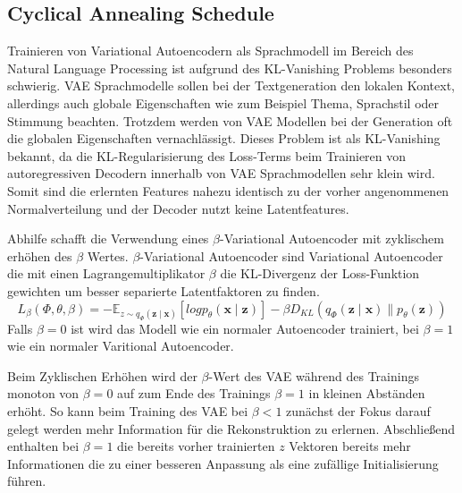 \subsection{Cyclical Annealing Schedule}
\label{cyc_anneal}
Trainieren von Variational Autoencodern als Sprachmodell im Bereich des Natural Language Processing ist aufgrund des KL-Vanishing Problems besonders schwierig.
VAE Sprachmodelle sollen bei der Textgeneration den lokalen Kontext, allerdings auch globale Eigenschaften wie zum Beispiel Thema, Sprachstil oder Stimmung beachten. 
Trotzdem werden von VAE Modellen bei der Generation oft die globalen Eigenschaften vernachlässigt. 
Dieses Problem ist als KL-Vanishing bekannt, da die KL-Regularisierung des Loss-Terms beim Trainieren von autoregressiven Decodern innerhalb von VAE Sprachmodellen sehr klein wird.
Somit sind die erlernten Features nahezu identisch zu der vorher angenommenen Normalverteilung und der Decoder nutzt keine Latentfeatures. %

Abhilfe schafft die Verwendung eines $\beta$-Variational Autoencoder \citep{cyc_anneal} mit zyklischem erhöhen des $\beta$ Wertes.
$\beta$-Variational Autoencoder sind Variational Autoencoder die mit einen Lagrangemultiplikator $\beta$ die KL-Divergenz der Loss-Funktion gewichten um besser separierte Latentfaktoren zu finden.
\begin{equation}
    L_{\beta}(\Phi,\theta,\beta) = -\mathbb{E}_{z\sim q_\Phi(\mathbf{z\mid x})}[log p_\theta (\mathbf{x\mid z})]- \beta D_{KL}(q_\Phi(\mathbf{z\mid x}) \parallel p_\theta(\mathbf{z})) 
\end{equation}
Falls $\beta = 0$ ist wird das Modell wie ein normaler Autoencoder trainiert, bei $\beta = 1$ wie ein normaler Varitional Autoencoder.

Beim Zyklischen Erhöhen wird der $\beta$-Wert des VAE während des Trainings monoton von $\beta=0$ auf zum Ende des Trainings $\beta=1$ in kleinen Abständen erhöht.
So kann beim Training des VAE bei $\beta<1$ zunächst der Fokus darauf gelegt werden mehr Information für die Rekonstruktion zu erlernen. 
Abschließend enthalten bei $\beta=1$ die bereits vorher trainierten $z$ Vektoren bereits mehr Informationen die zu einer besseren Anpassung als eine zufällige Initialisierung führen.



